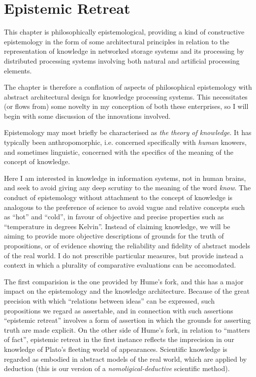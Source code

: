 
\chapter{Epistemic Retreat}\label{EpistemicRetreat}

This chapter is philosophically epistemological, providing a kind of
constructive epistemology in the form of some architectural principles
in relation to the representation of knowledge in networked storage
systems and its processing by distributed processing systems involving
both natural and artificial processing elements. 

The chapter is therefore a conflation of aspects of philosophical
epistemology with abstract architectural design for knowledge
processing systems. 
This necessitates (or flows from) some novelty in my conception of
both these enterprises, so I will begin with some discussion of the
innovations involved. 

Epistemology may most briefly be characterised as \emph{the theory of
  knowledge}. 
It has typically been anthropomorphic, i.e. concerned specifically
with \emph{human} knowers, and sometimes linguistic, concerned with
the specifics of the meaning of the concept of knowledge. 

Here I am interested in knowledge in information systems, not in human
brains, and seek to avoid giving any deep scrutiny to the meaning of
the word \emph{know}.
The conduct of epistemology without attachment to the concept of
knowledge is analogous to the preference of science to avoid vague and
relative concepts such as ``hot'' and ``cold'', in favour of objective
and precise properties such as ``temperature in degrees Kelvin''.
Instead of claiming knowledge, we will be aiming to provide more
objective descriptions of grounds for the truth of
propositions, or of evidence showing the reliability and fidelity of
abstract models of the real world.
I do not prescrible particular measures, but provide instead a context
in which a plurality of comparative evaluations can be accomodated.

The first comparision is the one provided by Hume's fork, and this has
a major impact on the epistemology and the knowledge architecture.
Because of the great precision with which ``relations between ideas''
can be expressed, such propositions we regard as assertable, and in
connection with such assertions ``epistemic retreat'' involves a form
of assertion in which the grounds for asserting truth are made
explicit.
On the other side of Hume's fork, in relation to ``matters of fact'',
epistemic retreat in the first instance reflects the imprecision in
our knowledge of Plato's fleeting world of appearances.
Scientific knowledge is regarded as embodied in abstract models of the
real world, which are applied by deduction (this is our version of a
\emph{nomoligical-deductive} scientific method).

